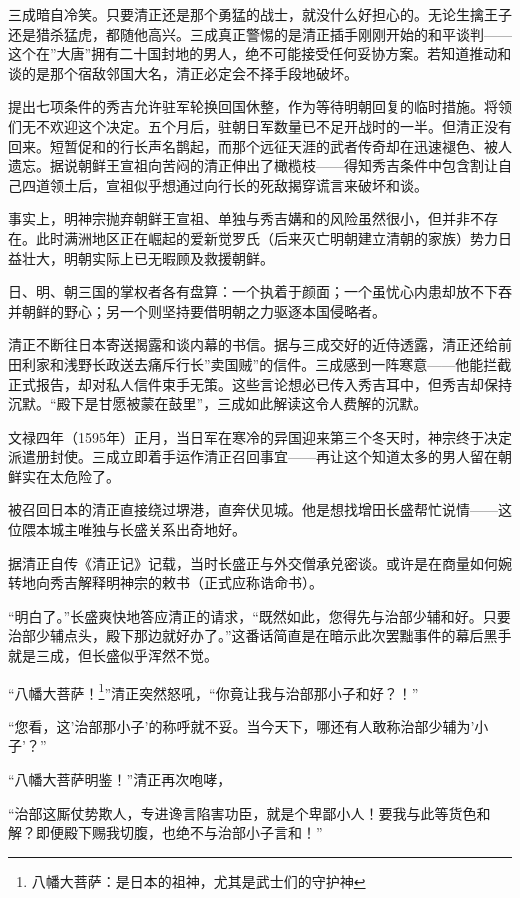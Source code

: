 \documentclass[
]{book}
\begin{document}
三成暗自冷笑。只要清正还是那个勇猛的战士，就没什么好担心的。无论生擒王子还是猎杀猛虎，都随他高兴。三成真正警惕的是清正插手刚刚开始的和平谈判------这个在''大唐''拥有二十国封地的男人，绝不可能接受任何妥协方案。若知道推动和谈的是那个宿敌邻国大名，清正必定会不择手段地破坏。

提出七项条件的秀吉允许驻军轮换回国休整，作为等待明朝回复的临时措施。将领们无不欢迎这个决定。五个月后，驻朝日军数量已不足开战时的一半。但清正没有回来。短暂促和的行长声名鹊起，而那个远征天涯的武者传奇却在迅速褪色、被人遗忘。据说朝鲜王宣祖向苦闷的清正伸出了橄榄枝------得知秀吉条件中包含割让自己四道领土后，宣祖似乎想通过向行长的死敌揭穿谎言来破坏和谈。

事实上，明神宗抛弃朝鲜王宣祖、单独与秀吉媾和的风险虽然很小，但并非不存在。此时满洲地区正在崛起的爱新觉罗氏（后来灭亡明朝建立清朝的家族）势力日益壮大，明朝实际上已无暇顾及救援朝鲜。

日、明、朝三国的掌权者各有盘算：一个执着于颜面；一个虽忧心内患却放不下吞并朝鲜的野心；另一个则坚持要借明朝之力驱逐本国侵略者。

清正不断往日本寄送揭露和谈内幕的书信。据与三成交好的近侍透露，清正还给前田利家和浅野长政送去痛斥行长''卖国贼''的信件。三成感到一阵寒意------他能拦截正式报告，却对私人信件束手无策。这些言论想必已传入秀吉耳中，但秀吉却保持沉默。``殿下是甘愿被蒙在鼓里''，三成如此解读这令人费解的沉默。

文禄四年（1595年）正月，当日军在寒冷的异国迎来第三个冬天时，神宗终于决定派遣册封使。三成立即着手运作清正召回事宜------再让这个知道太多的男人留在朝鲜实在太危险了。

被召回日本的清正直接绕过堺港，直奔伏见城。他是想找增田长盛帮忙说情------这位隈本城主唯独与长盛关系出奇地好。

据清正自传《清正记》记载，当时长盛正与外交僧承兑密谈。或许是在商量如何婉转地向秀吉解释明神宗的敕书（正式应称诰命书）。

``明白了。''长盛爽快地答应清正的请求，``既然如此，您得先与治部少辅和好。只要治部少辅点头，殿下那边就好办了。''这番话简直是在暗示此次罢黜事件的幕后黑手就是三成，但长盛似乎浑然不觉。

``八幡大菩萨！\footnote{八幡大菩萨：是日本的祖神，尤其是武士们的守护神}''清正突然怒吼，``你竟让我与治部那小子和好？！''

``您看，这'治部那小子'的称呼就不妥。当今天下，哪还有人敢称治部少辅为'小子'？''

``八幡大菩萨明鉴！''清正再次咆哮，

``治部这厮仗势欺人，专进谗言陷害功臣，就是个卑鄙小人！要我与此等货色和解？即便殿下赐我切腹，也绝不与治部小子言和！''
\end{document}
